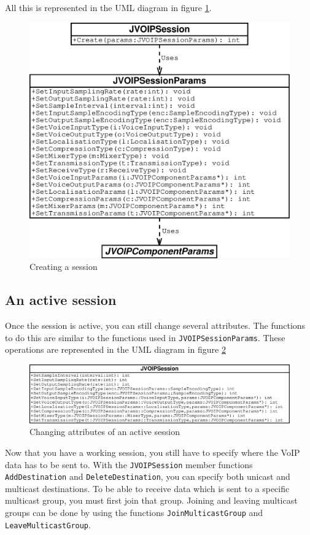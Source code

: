 		All this is represented in the UML diagram in figure \ref{create-session-schema}.
		\begin{figure}
			\center
			\includegraphics[width=0.85\linewidth]{images/manual/chapter2/create-session-schema.eps}
			\caption{Creating a session}
			\label{create-session-schema}
		\end{figure}
		
		\subsection{An active session}
		
		Once the session is active, you can still change several attributes. The
		functions to do this are similar to the functions used in
		{\tt JVOIPSessionParams}. These operations are represented in the UML diagram in
		figure \ref{change-session-params}
		\begin{figure}
			\center
			\includegraphics[width=\linewidth]{images/manual/chapter2/change-session-params.eps}
			\caption{Changing attributes of an active session}
			\label{change-session-params}
		\end{figure}
		
		Now that you have a working session, you still have to specify where the
		VoIP data has to be sent to. With the {\tt JVOIP\-Ses\-sion} member functions
		{\tt Add\-Destina\-tion} and {\tt Delete\-Destina\-tion}, you can specify
		both unicast and multicast destinations. To be able to receive data which is sent
		to a specific multicast group, you must first join that group. Joining and leaving
		multicast groups can be done by using the functions {\tt JoinMulticastGroup} and
		{\tt LeaveMulticastGroup}.
		

